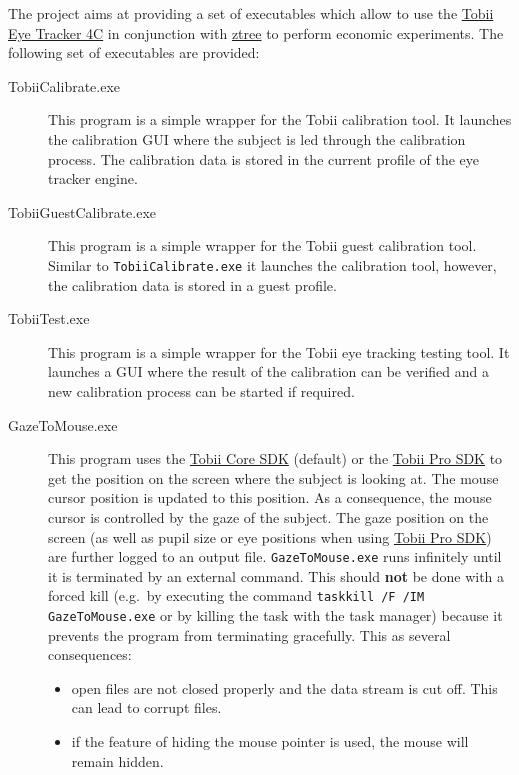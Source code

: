\documentclass[a4paper,oneside]{book}
\begin{document}
The project aims at providing a set of executables which allow to use the \href{https://tobiigaming.com/eye-tracker-4c/}{Tobii Eye Tracker 4C} in conjunction with \href{http://www.ztree.uzh.ch/en.html}{ztree} to perform economic experiments.
The following set of executables are provided:
\begin{description}
    \item[TobiiCalibrate.exe] This program is a simple wrapper for the Tobii calibration tool.
        It launches the calibration GUI where the subject is led through the calibration process.
        The calibration data is stored in the current profile of the eye tracker engine.
    \item[TobiiGuestCalibrate.exe] This program is a simple wrapper for the Tobii guest calibration tool.
        Similar to \texttt{TobiiCalibrate.exe} it launches the calibration tool, however, the calibration data is stored in a guest profile.
    \item[TobiiTest.exe] This program is a simple wrapper for the Tobii eye tracking testing tool.
        It launches a GUI where the result of the calibration can be verified and a new calibration process can be started if required.
    \item[GazeToMouse.exe] This program uses the \href{http://developer.tobii.com/tobii-core-sdk/}{Tobii Core SDK} (default) or the \href{http://developer.tobii.com/tobii-pro-sdk/}{Tobii Pro SDK} to get the position on the screen where the subject is looking at.
        The mouse cursor position is updated to this position.
        As a consequence, the mouse cursor is controlled by the gaze of the subject.
        The gaze position on the screen (as well as pupil size or eye positions when using \href{http://developer.tobii.com/tobii-pro-sdk/}{Tobii Pro SDK}) are further logged to an output file.
        \texttt{GazeToMouse.exe} runs infinitely until it is terminated by an external command.
        This should \textbf{not} be done with a forced kill (e.g.~by executing the command \texttt{taskkill /F /IM GazeToMouse.exe} or by killing the task with the task manager) because it prevents the program from terminating gracefully.
        This as several consequences:
        \begin{itemize}
            \item open files are not closed properly and the data stream is cut off. This can lead to corrupt files.
            \item if the feature of hiding the mouse pointer is used, the mouse will remain hidden.

\end{itemize}
\end{description}
\end{document}
